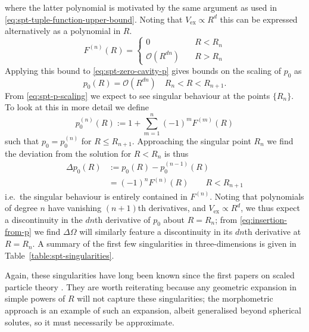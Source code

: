 \documentclass[11pt,twoside]{report}
\begin{document}
where the latter polynomial is motivated by the same argument as used in \eqref{eq:spt-tuple-function-upper-bound}.
Noting that $V_\mathrm{ex} \propto R^d$ this can be expressed alternatively as a polynomial in $R$.
\begin{equation*}
  F^{(n)}(R) =
  \begin{cases}
    0 & \quad R < R_n \\
    \mathcal{O}\left( R^{dn} \right) & \quad R > R_n
  \end{cases}
\end{equation*}
Applying this bound to \eqref{eq:spt-zero-cavity-p} gives bounds on the scaling of $p_0$ as
\begin{equation}\label{eq:spt-p-scaling}
  p_0(R) =
  \mathcal{O}\left( R^{dn} \right)
  \quad R_n < R < R_{n+1}.
\end{equation}
From \eqref{eq:spt-p-scaling} we expect to see singular behaviour at the points $\{R_n\}$.
To look at this in more detail we define
\begin{equation*}
  p_0^{(n)}(R) := 1 + \sum_{m=1}^n (-1)^m F^{(m)}(R)
\end{equation*}
such that $p_0 = p_0^{(n)}$ for $R \le R_{n+1}$.
Approaching the singular point $R_n$ we find the deviation from the solution for $R < R_n$ is thus
\begin{equation*}
  \begin{split}
    \Delta p_0(R) &:=
    p_0(R) - p_0^{(n-1)}(R)
    \\ &=
    (-1)^n F^{(n)}(R)
    \qquad R < R_{n+1}
  \end{split}
\end{equation*}
i.e.\ the singular behaviour is entirely contained in $F^{(n)}$.
Noting that polynomials of degree $n$ have vanishing $(n+1)$th derivatives, and $V_\mathrm{ex} \propto R^d$, we thus expect a discontinuity in the $dn$th derivative of $p_0$ about $R=R_n$; from \eqref{eq:insertion-from-p} we find $\Delta \Omega$ will similarly feature a discontinuity in its $dn$th derivative at $R=R_n$.
A summary of the first few singularities in three-dimensions is given in Table~\ref{table:spt-singularities}.

Again, these singularities have long been known since the first papers on scaled particle theory \cite{ReissJCP1959,ReissJCP1960}.
They are worth reiterating because any geometric expansion in simple powers of $R$ will not capture these singularities; the morphometric approach is an example of such an expansion, albeit generalised beyond spherical solutes, so it must necessarily be approximate.
\end{document}
